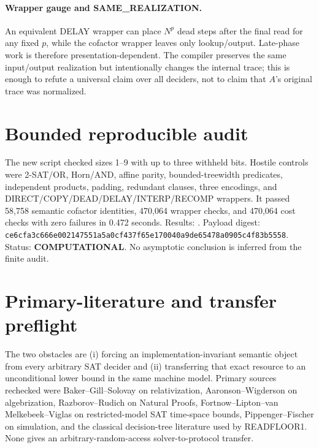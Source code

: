 \documentclass[11pt]{article}
\newcommand{\COMP}{\textbf{COMPUTATIONAL}}
\begin{document}
\paragraph{Wrapper gauge and SAME\_REALIZATION.}
An equivalent DELAY wrapper can place \(N^p\) dead steps after the final read
for any fixed \(p\), while the cofactor wrapper leaves only lookup/output.
Late-phase work is therefore presentation-dependent. The compiler preserves
the same input/output realization but intentionally changes the internal
trace; this is enough to refute a universal claim over all deciders, not to
claim that \(A\)'s original trace was normalized.

\section*{Bounded reproducible audit}
The new script
 checked
sizes 1--9 with up to three withheld bits. Hostile controls were 2-SAT/OR,
Horn/AND, affine parity, bounded-treewidth predicates, independent products,
padding, redundant clauses, three encodings, and
DIRECT/COPY/DEAD/DELAY/INTERP/RECOMP wrappers. It passed 58,758 semantic
cofactor identities, 470,064 wrapper checks, and 470,064 cost checks with
zero failures in 0.472 seconds. Results:
.
Payload digest:
\texttt{ce6cfa3c666e002147551a5a0cf437f65e170040a9de65478a0905c4f83b5558}.
Status: \COMP. No asymptotic conclusion is inferred from the finite audit.

\section*{Primary-literature and transfer preflight}
The two obstacles are (i) forcing an implementation-invariant semantic object
from every arbitrary SAT decider and (ii) transferring that exact resource to
an unconditional lower bound in the same machine model. Primary sources
rechecked were Baker--Gill--Solovay on relativization,
Aaronson--Wigderson on algebrization, Razborov--Rudich on Natural Proofs,
Fortnow--Lipton--van Melkebeek--Viglas on restricted-model SAT time-space
bounds, Pippenger--Fischer on simulation, and the classical decision-tree
literature used by READFLOOR1. None gives an arbitrary-random-access
solver-to-protocol transfer.
\end{document}
